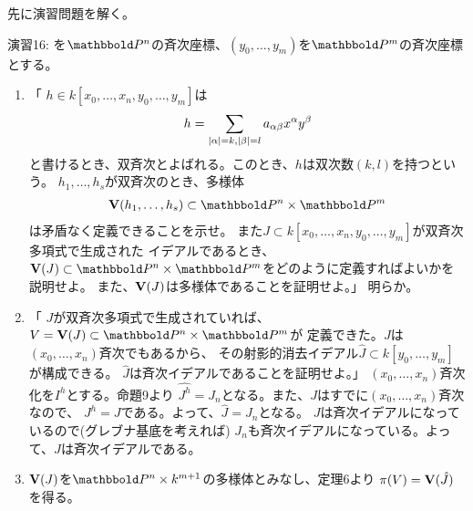 先に演習問題を解く。
\begin{framed}
  演習16:
  \xs を$\P^n$の斉次座標、$(y_0,\dots,y_m)$を$\P^m$の斉次座標とする。
  \begin{enumerate}[label=(\alph*)]
    \item 「
    $h\in k[x_0,\dots,x_n,y_0,\dots,y_m]$は
    \begin{align}
      h=\sum_{\left|\alpha\right|=k,\left|\beta\right|=l}a_{\alpha \beta}x^\alpha y^\beta
    \end{align}
    と書けるとき、双斉次とよばれる。このとき、$h$は双次数$(k,l)$を持つという。
    $h_1,\dots,h_s$が双斉次のとき、多様体
    \begin{align}
      \var(h_1,\dots,h_s) \subset \P^n  \times \P^m
    \end{align}
    は矛盾なく定義できることを示せ。
    また$J\subset k[x_0,\dots,x_n,y_0,\dots,y_m]$が双斉次多項式で生成された
    イデアルであるとき、$\var(J)\subset \P^n \times \P^m$をどのように定義すればよいかを説明せよ。
    また、$\textbf V(J)$は多様体であることを証明せよ。」
    明らか。
    \item
    「
    $J$が双斉次多項式で生成されていれば、$V=\var(J)\subset \P^n \times \P^m$が
    定義できた。$J$は$(x_0,\dots,x_n)$斉次でもあるから、
    その射影的消去イデアル$\hat J \subset k[y_0,\dots,y_m]$が構成できる。
    $\hat J$は斉次イデアルであることを証明せよ。」
    $(x_0,\dots,x_n)$斉次化を$I^h$とする。命題9より
    $\hat{J^h}=J_n$となる。また、$J$はすでに$(x_0,\dots,x_n)$斉次なので、
    $J^h = J$である。よって、$\hat J = J_n$となる。
    $J$は斉次イデアルになっているので(グレブナ基底を考えれば)
    $J_n$も斉次イデアルになっている。よって、$\hat J$は斉次イデアルである。
    \item
    $\textbf V(J)$を$\P^n\times k^{m+1}$の多様体とみなし、定理6より
    $\pi(V) = \textbf V(\hat J)$を得る。
  \end{enumerate}
\end{framed}

